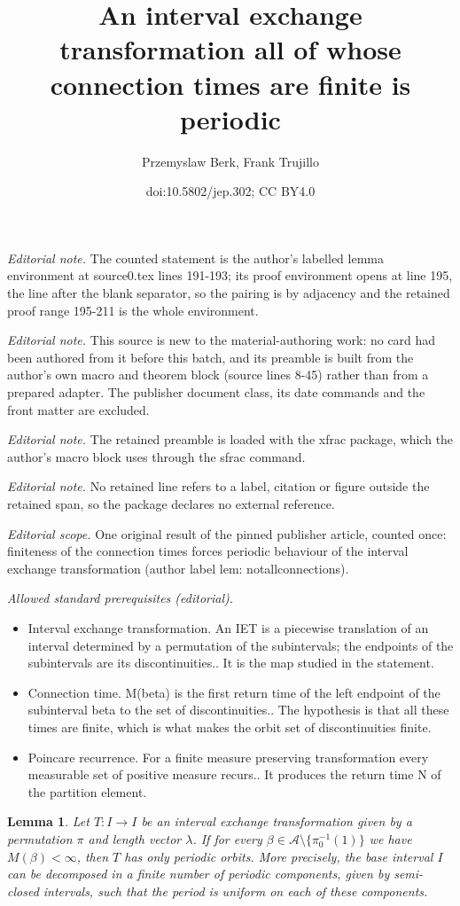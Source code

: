 \documentclass[10pt,a4paper]{article}
\title{An interval exchange transformation all of whose connection times are finite is periodic}
\author{Przemyslaw Berk, Frank Trujillo}
\date{doi:10.5802/jep.302; CC BY4.0}
\theoremstyle{plain}
\newtheorem{lemma}[theorem]{Lemma}
\theoremstyle{definition}
\newcommand{\A}{\mathcal{A}}
\begin{document}
\maketitle
\noindent\textit{Editorial note.} The counted statement is the author's labelled lemma environment at source0.tex lines 191-193; its proof environment opens at line 195, the line after the blank separator, so the pairing is by adjacency and the retained proof range 195-211 is the whole environment.\par\medskip
\noindent\textit{Editorial note.} This source is new to the material-authoring work: no card had been authored from it before this batch, and its preamble is built from the author's own macro and theorem block (source lines 8-45) rather than from a prepared adapter. The publisher document class, its date commands and the front matter are excluded.\par\medskip
\noindent\textit{Editorial note.} The retained preamble is loaded with the xfrac package, which the author's macro block uses through the sfrac command.\par\medskip
\noindent\textit{Editorial note.} No retained line refers to a label, citation or figure outside the retained span, so the package declares no external reference.\par\medskip
\noindent\textit{Editorial scope.} One original result of the pinned publisher article, counted once: finiteness of the connection times forces periodic behaviour of the interval exchange transformation (author label lem: notallconnections).\par\medskip
\noindent\textit{Allowed standard prerequisites (editorial).}\begin{itemize}
\item Interval exchange transformation. An IET is a piecewise translation of an interval determined by a permutation of the subintervals; the endpoints of the subintervals are its discontinuities.. It is the map studied in the statement.
\item Connection time. M(beta) is the first return time of the left endpoint of the subinterval beta to the set of discontinuities.. The hypothesis is that all these times are finite, which is what makes the orbit set of discontinuities finite.
\item Poincare recurrence. For a finite measure preserving transformation every measurable set of positive measure recurs.. It produces the return time N of the partition element.
\end{itemize}\medskip
\begin{lemma}\label{lem: notallconnections}
Let $T:I\to I$ be an interval exchange transformation given by a permutation $\pi$ and length vector $\lambda$. If for every $\beta\in \A\setminus \{\pi_0^{-1}(1)\}$ we have $M(\beta)<\infty$, then $T$ has only periodic orbits. {More precisely, the base interval $I$ can be decomposed in a finite number of periodic components, given by semi-closed intervals, such that the period is uniform on each of these components.}
\end{lemma}
\end{document}
